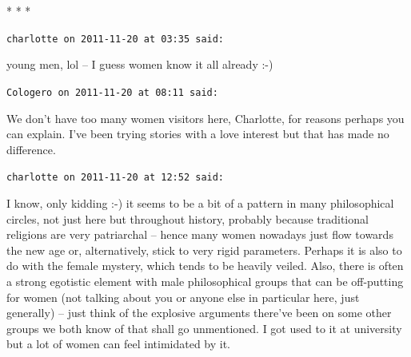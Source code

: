 
\begin{center}* * *\end{center}

\begin{footnotesize}
\begin{sffamily}
\texttt{charlotte on 2011-11-20 at 03:35 said:}

young men, lol -- I guess women know it all already :-)

\hfill

\texttt{Cologero on 2011-11-20 at 08:11 said:}

We don't have too many women visitors here, Charlotte, for reasons perhaps you can explain. I've been trying stories with a love interest but that has made no difference.

\hfill

\texttt{charlotte on 2011-11-20 at 12:52 said:}

I know, only kidding :-) it seems to be a bit of a pattern in many philosophical circles, not just here but throughout history, probably because traditional religions are very patriarchal -- hence many women nowadays just flow towards the new age or, alternatively, stick to very rigid parameters. Perhaps it is also to do with the female mystery, which tends to be heavily veiled. Also, there is often a strong egotistic element with male philosophical groups that can be off-putting for women (not talking about you or anyone else in particular here, just generally) -- just think of the explosive arguments there've been on some other groups we both know of that shall go unmentioned. I got used to it at university but a lot of women can feel intimidated by it.


\hfill

\end{sffamily}
\end{footnotesize}

